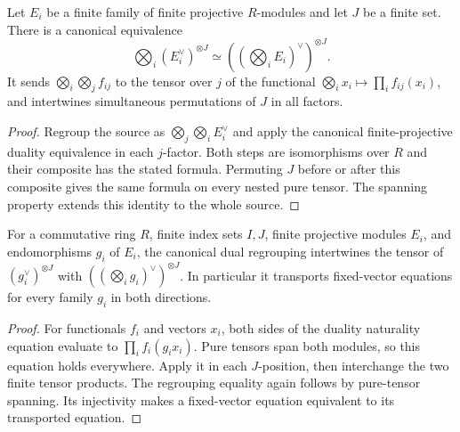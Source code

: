 \begin{lemma}
\label{lem:dual-regrouping}
\leanok
Let $E_i$ be a finite family of finite projective $R$-modules and
let $J$ be a finite set. There is a canonical equivalence
\[
 \bigotimes_i (E_i^\vee)^{\otimes J}
 \simeq \left(\left(\bigotimes_i E_i\right)^\vee\right)^{\otimes J}.
\]
It sends $\bigotimes_i\bigotimes_j f_{ij}$ to the tensor over $j$
of the functional $\bigotimes_i x_i\mapsto\prod_i f_{ij}(x_i)$,
and intertwines simultaneous permutations of $J$ in all factors.
\end{lemma}
\begin{proof}
Regroup the source as $\bigotimes_j\bigotimes_i E_i^\vee$ and
apply the canonical finite-projective duality equivalence in each
$j$-factor. Both steps are isomorphisms over $R$ and their composite
has the stated formula. Permuting $J$ before or after this composite
gives the same formula on every nested pure tensor. The spanning
property extends this identity to the whole source.
\end{proof}

\begin{lemma}
\label{lem:dual-regrouping-naturality}
\leanok
For a commutative ring $R$, finite index sets $I,J$, finite projective
modules $E_i$, and endomorphisms $g_i$ of $E_i$, the canonical dual
regrouping intertwines the tensor of $(g_i^\vee)^{\otimes J}$ with
$((\bigotimes_i g_i)^\vee)^{\otimes J}$. In particular it transports
fixed-vector equations for every family $g_i$ in both directions.
\end{lemma}
\begin{proof}
For functionals $f_i$ and vectors $x_i$, both sides of the duality
naturality equation evaluate to $\prod_i f_i(g_i x_i)$. Pure tensors
span both modules, so this equation holds everywhere. Apply it in each
$J$-position, then interchange the two finite tensor products. The
regrouping equality again follows by pure-tensor spanning. Its injectivity
makes a fixed-vector equation equivalent to its transported equation.
\end{proof}


